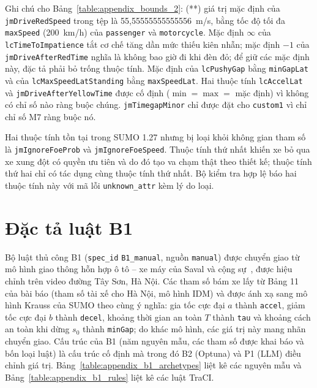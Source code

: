 \documentclass[../main.tex]{subfiles}
\begin{document}
\begin{sloppypar}
Ghi chú cho Bảng~\ref{table:appendix_bounds_2}: (**) giá trị mặc định của \texttt{jmDriveRedSpeed} trong tệp là 55,55555555555556~m/s, bằng tốc độ tối đa \texttt{maxSpeed} (200~km/h) của \texttt{passenger} và \texttt{motorcycle}. Mặc định $\infty$ của \texttt{lcTimeToImpatience} tắt cơ chế tăng dần mức thiếu kiên nhẫn; mặc định $-1$ của \texttt{jmDriveAfterRedTime} nghĩa là không bao giờ đi khi đèn đỏ; để giữ các mặc định này, đặc tả phải bỏ trống thuộc tính. Mặc định của \texttt{lcPushyGap} bằng \texttt{minGapLat} và của \texttt{lcMaxSpeedLatStanding} bằng \texttt{maxSpeedLat}. Hai thuộc tính \texttt{lcAccelLat} và \texttt{jmDriveAfterYellowTime} được cố định ($\min = \max =$ mặc định) vì không có chỉ số nào ràng buộc chúng. \texttt{jmTimegapMinor} chỉ được đặt cho \texttt{custom1} vì chỉ chỉ số M7 ràng buộc nó.
\end{sloppypar}

Hai thuộc tính tồn tại trong SUMO 1.27 nhưng bị loại khỏi không gian tham số là \texttt{jmIgnoreFoeProb} và \texttt{jmIgnoreFoeSpeed}. Thuộc tính thứ nhất khiến xe bỏ qua xe xung đột có quyền ưu tiên và do đó tạo va chạm thật theo thiết kế; thuộc tính thứ hai chỉ có tác dụng cùng thuộc tính thứ nhất. Bộ kiểm tra hợp lệ báo hai thuộc tính này với mã lỗi \texttt{unknown\_attr} kèm lý do loại.

\section{Đặc tả luật B1}
\label{section:appendix_b1}

Bộ luật thủ công B1 (\texttt{spec\_id} \texttt{B1\_manual}, nguồn \texttt{manual}) được chuyển giao từ mô hình giao thông hỗn hợp ô tô -- xe máy của Saval và cộng sự~\cite{saval2023mixed}, được hiệu chỉnh trên video đường Tây Sơn, Hà Nội. Các tham số bám xe lấy từ Bảng 11 của bài báo (tham số tài xế cho Hà Nội, mô hình IDM) và được ánh xạ sang mô hình Krauss của SUMO theo cùng ý nghĩa: gia tốc cực đại $a$ thành \texttt{accel}, giảm tốc cực đại $b$ thành \texttt{decel}, khoảng thời gian an toàn $T$ thành \texttt{tau} và khoảng cách an toàn khi dừng $s_0$ thành \texttt{minGap}; do khác mô hình, các giá trị này mang nhãn chuyển giao. Cấu trúc của B1 (năm nguyên mẫu, các tham số được khai báo và bốn loại luật) là cấu trúc cố định mà trong đó B2 (Optuna) và P1 (LLM) điều chỉnh giá trị. Bảng~\ref{table:appendix_b1_archetypes} liệt kê các nguyên mẫu và Bảng~\ref{table:appendix_b1_rules} liệt kê các luật TraCI.
\end{document}
